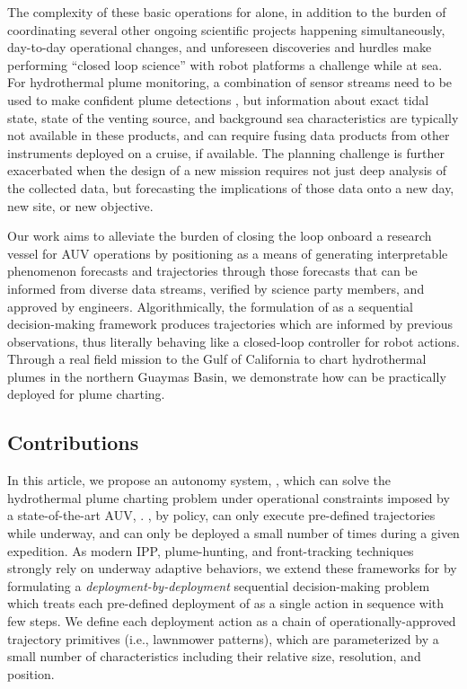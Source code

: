 The complexity of these basic operations for \Sentry alone, in addition to the burden of coordinating several other ongoing scientific projects happening simultaneously, day-to-day operational changes, and unforeseen discoveries and hurdles make performing ``closed loop science'' with robot platforms a challenge while at sea. For hydrothermal plume monitoring, a combination of sensor streams need to be used to make confident plume detections \cite{jakuba2007stochastic}, but information about exact tidal state, state of the venting source, and background sea characteristics are typically not available in these products, and can require fusing data products from other instruments deployed on a cruise, if available. The planning challenge is further exacerbated when the design of a new mission requires not just deep analysis of the collected data, but forecasting the implications of those data onto a new day, new site, or new objective. 

Our work aims to alleviate the burden of closing the loop onboard a research vessel for AUV operations by positioning \PHORTEX as a means of generating interpretable phenomenon forecasts and trajectories through those forecasts that can be informed from diverse data streams, verified by science party members, and approved by \Sentry engineers. Algorithmically, the formulation of \PHORTEX as a sequential decision-making framework produces trajectories which are informed by previous observations, thus literally behaving like a closed-loop controller for robot actions. Through a real field mission to the Gulf of California to chart hydrothermal plumes in the northern Guaymas Basin, we demonstrate how \PHORTEX can be practically deployed for plume charting.


\subsection{Contributions}

In this article, we propose an autonomy system, \PHORTEX, which can solve the hydrothermal plume charting problem under operational constraints imposed by a state-of-the-art AUV, \Sentry. \Sentry, by policy, can only execute pre-defined trajectories while underway, and can only be deployed a small number of times during a given expedition. As modern IPP, plume-hunting, and front-tracking techniques strongly rely on underway adaptive behaviors, we extend these frameworks for \Sentry by formulating a \emph{deployment-by-deployment} sequential decision-making problem which treats each pre-defined deployment of \Sentry as a single action in sequence with few steps. We define each deployment action as a chain of operationally-approved trajectory primitives (i.e., lawnmower patterns), which are parameterized by a small number of characteristics including their relative size, resolution, and position. 


